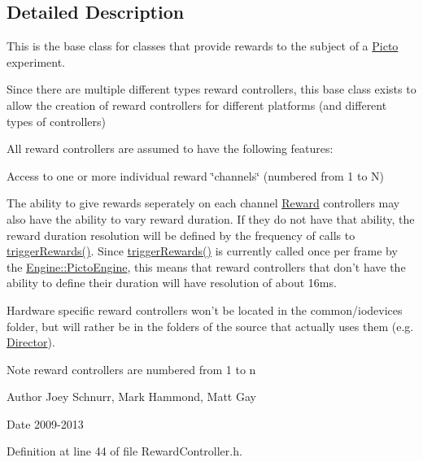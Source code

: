 \subsection{Detailed Description}
This is the base class for classes that provide rewards to the subject of a \hyperlink{namespace_picto}{Picto} experiment. 

Since there are multiple different types reward controllers, this base class exists to allow the creation of reward controllers for different platforms (and different types of controllers)

All reward controllers are assumed to have the following features\-:
\begin{DoxyItemize}
\item Access to one or more individual reward \char`\"{}channels\char`\"{} (numbered from 1 to N)
\item The ability to give rewards seperately on each channel \hyperlink{class_picto_1_1_reward}{Reward} controllers may also have the ability to vary reward duration. If they do not have that ability, the reward duration resolution will be defined by the frequency of calls to \hyperlink{class_picto_1_1_reward_controller_ae9f9b5b07f824d9078b30cb116ff3323}{trigger\-Rewards()}. Since \hyperlink{class_picto_1_1_reward_controller_ae9f9b5b07f824d9078b30cb116ff3323}{trigger\-Rewards()} is currently called once per frame by the \hyperlink{class_picto_1_1_engine_1_1_picto_engine}{Engine\-::\-Picto\-Engine}, this means that reward controllers that don't have the ability to define their duration will have resolution of about 16ms.
\end{DoxyItemize}

Hardware specific reward controllers won't be located in the common/iodevices folder, but will rather be in the folders of the source that actually uses them (e.\-g. \hyperlink{class_director}{Director}).

\begin{DoxyNote}{Note}
reward controllers are numbered from 1 to n 
\end{DoxyNote}
\begin{DoxyAuthor}{Author}
Joey Schnurr, Mark Hammond, Matt Gay 
\end{DoxyAuthor}
\begin{DoxyDate}{Date}
2009-\/2013 
\end{DoxyDate}


Definition at line 44 of file Reward\-Controller.\-h.



